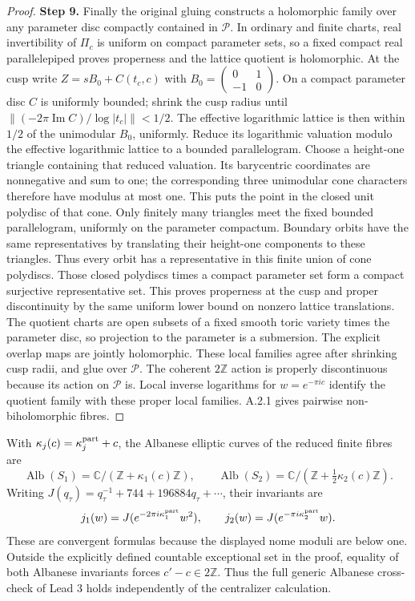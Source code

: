 \begin{proof}
\par\smallskip\noindent\textbf{Step 9.} Finally the original gluing constructs a holomorphic family over any parameter disc compactly contained in $\mathcal P$. In ordinary and finite charts, real invertibility of $\Pi_c$ is uniform on compact parameter sets, so a fixed compact real parallelepiped proves properness and the lattice quotient is holomorphic. At the cusp write $Z=sB_0+C(t_c,c)$ with $B_0=\left(\begin{smallmatrix}0&1\\-1&0\end{smallmatrix}\right)$. On a compact parameter disc $C$ is uniformly bounded; shrink the cusp radius until
$\|(-2\pi\operatorname{Im}C)/\log|t_c|\|<1/2$. The effective logarithmic lattice is then within $1/2$ of the unimodular $B_0$, uniformly. Reduce its logarithmic valuation modulo the effective logarithmic lattice to a bounded parallelogram. Choose a height-one triangle containing that reduced valuation. Its barycentric coordinates are nonnegative and sum to one; the corresponding three unimodular cone characters therefore have modulus at most one. This puts the point in the closed unit polydisc of that cone. Only finitely many triangles meet the fixed bounded parallelogram, uniformly on the parameter compactum. Boundary orbits have the same representatives by translating their height-one components to these triangles. Thus every orbit has a representative in this finite union of cone polydiscs. Those closed polydiscs times a compact parameter set form a compact surjective representative set. This proves properness at the cusp and proper discontinuity by the same uniform lower bound on nonzero lattice translations. The quotient charts are open subsets of a fixed smooth toric variety times the parameter disc, so projection to the parameter is a submersion. The explicit overlap maps are jointly holomorphic. These local families agree after shrinking cusp radii, and glue over $\mathcal P$. The coherent $2\mathbb Z$ action is properly discontinuous because its action on $\mathcal P$ is. Local inverse logarithms for $w=e^{-\pi ic}$ identify the quotient family with these proper local families. A.2.1 gives pairwise non-biholomorphic fibres.
\end{proof}
\begin{proposition}[FAM A.4.1; T]\label{fam:A.4.1}
With $\kappa_j(c)=\kappa_j^{\rm part}+c$, the Albanese elliptic curves of the reduced finite fibres are
\[
 \operatorname{Alb}(S_1)=\mathbb C/(\mathbb Z+\kappa_1(c)\mathbb Z),\qquad
 \operatorname{Alb}(S_2)=\mathbb C/(\mathbb Z+\tfrac12\kappa_2(c)\mathbb Z).
\]
Writing $J(q_\tau)=q_\tau^{-1}+744+196884q_\tau+\cdots$, their invariants are
\[
 j_1(w)=J(e^{-2\pi i\kappa_1^{\rm part}}w^2),\qquad
 j_2(w)=J(e^{-\pi i\kappa_2^{\rm part}}w).
\]
These are convergent formulas because the displayed nome moduli are below one. Outside the explicitly defined countable exceptional set in the proof, equality of both Albanese invariants forces $c'-c\in2\mathbb Z$. Thus the full generic Albanese cross-check of Lead 3 holds independently of the centralizer calculation.
\end{proposition}
